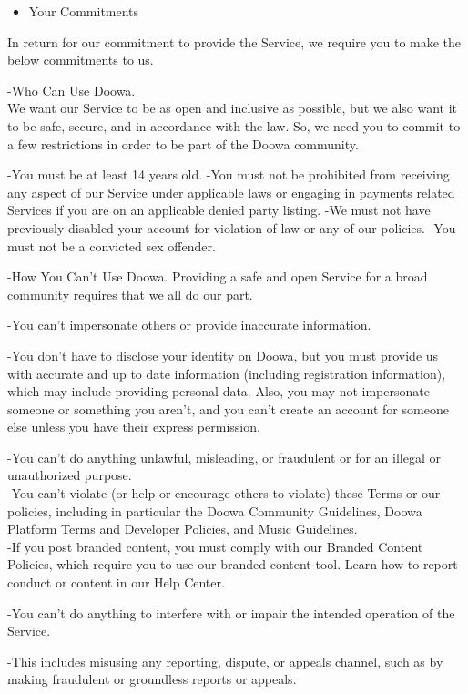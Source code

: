 \documentclass[conference]{IEEEtran}
\begin{document}
\begin{itemize}
\item Your Commitments
\end{itemize}
In return for our commitment to provide the Service, we require you to make the below commitments to us.

-Who Can Use Doowa.\\
We want our Service to be as open and inclusive as possible, but we also want it to be safe, secure, and in accordance with the law. So, we need you to commit to a few restrictions in order to be part of the Doowa community.

-You must be at least 14 years old.
-You must not be prohibited from receiving any aspect of our Service under applicable laws or engaging in payments related Services if you are on an applicable denied party listing.
-We must not have previously disabled your account for violation of law or any of our policies.
-You must not be a convicted sex offender.

-How You Can't Use Doowa. 
Providing a safe and open Service for a broad community requires that we all do our part.

-You can't impersonate others or provide inaccurate information.

-You don't have to disclose your identity on Doowa, but you must provide us with accurate and up to date information (including registration information), which may include providing personal data. Also, you may not impersonate someone or something you aren't, and you can't create an account for someone else unless you have their express permission.

-You can't do anything unlawful, misleading, or fraudulent or for an illegal or unauthorized purpose.\\

-You can't violate (or help or encourage others to violate) these Terms or our policies, including in particular the Doowa Community Guidelines, Doowa Platform Terms and Developer Policies, and Music Guidelines.\\

-If you post branded content, you must comply with our Branded Content Policies, which require you to use our branded content tool. Learn how to report conduct or content in our Help Center.

-You can't do anything to interfere with or impair the intended operation of the Service.

-This includes misusing any reporting, dispute, or appeals channel, such as by making fraudulent or groundless reports or appeals.
\end{document}
